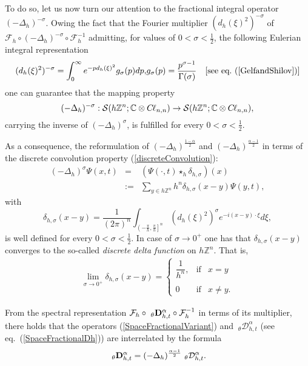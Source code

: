 \documentclass{elsarticle}
\newcommand{\BC}{{\mathbb C}}
\newcommand{\BZ}{{\mathbb Z}}
\newcommand{\Qh}{\left(-\frac{\pi}{h},\frac{\pi}{h}\right]^n}
\newcommand{\cl}{C \kern -0.1em \ell}
\begin{document}
To do so, let us now turn our attention to the fractional integral operator $(-\Delta_h)^{-\sigma}$. Owing the fact that the Fourier multiplier $(d_h(\xi)^2)^{-\sigma}$ of $\mathcal{F}_h\circ (-\Delta_h)^{-\sigma} \circ \mathcal{F}_h^{-1}$ admitting, for values of $0<\sigma<\frac{1}{2}$,
the following Eulerian integral representation
\begin{eqnarray*}
	(d_h(\xi)^2)^{-\sigma}=\int_0^\infty e^{-pd_h(\xi)^2} g_\sigma(p) dp, & g_\sigma(p)=\dfrac{p^{\sigma-1}}{\Gamma(\sigma)} & [\mbox{see eq.}~(\ref{GelfandShilov})]
\end{eqnarray*}
one can guarantee that the mapping property $$(-\Delta_h)^{-\sigma}:\mathcal{S}(h\BZ^n;\BC \otimes \cl_{n,n})\rightarrow \mathcal{S}(h\BZ^n;\BC \otimes \cl_{n,n}),$$
carrying the inverse of $(-\Delta_h)^{\sigma}$, is fulfilled for every $0<\sigma<\frac{1}{2}$.

As a consequence, the reformulation of $(-\Delta_h)^{\frac{1-\alpha}{2}}$ and $(-\Delta_h)^{\frac{\alpha-1}{2}}$ in terms of the discrete convolution property (\ref{discreteConvolution}):
\begin{eqnarray*}
	(-\Delta_h)^{\sigma}\Psi(x,t) &=& (\Psi (\cdot,t) \star_{h} \delta_{h,\sigma})(x)\\
	&:=&\sum_{y\in h\BZ^n} h^n \delta_{h,\sigma}(x-y)\Psi(y,t),
\end{eqnarray*}
with
$$
\delta_{h,\sigma}(x-y)=
\frac{1}{(2\pi)^{n}}\int_{\Qh} \left(d_h(\xi)^2\right)^\sigma e^{-i(x-y)\cdot \xi}d\xi,
$$
is well defined for every $0<\sigma<\frac{1}{2}$. In case of $\sigma\rightarrow 0^+$ one has that $\delta_{h,\sigma}(x-y)$ converges to the so-called {\it discrete delta function} on $h\BZ^n$. That is,
\begin{eqnarray*}
	\lim_{\sigma\rightarrow 0^+}\delta_{h,\sigma}(x-y)= \left\{\begin{array}{lll} 
		\dfrac{1}{h^n}, &\mbox{if} & x=y
		\\ \ \\
		0 &\mbox{if} & x\neq y.
	\end{array}\right.
\end{eqnarray*}



From the spectral representation $\mathcal{F}_h\circ {~}_\theta{\bf D}_{h,t}^{\alpha}\circ \mathcal{F}_h^{-1}$ in terms of its multiplier,
there holds that
the operators 
(\ref{SpaceFractionalVariant}) and ${~}_\theta\mathcal{ D}_{h,t}^{\alpha}$ (see eq.~(\ref{SpaceFractionalDh})) are interrelated by the formula
$$
{~}_\theta{\bf D}_{h,t}^\alpha=(-\Delta_h)^{\frac{\alpha-1}{2}}{~}_\theta\mathcal{D}_{h,t}^\alpha.
$$
\end{document}
